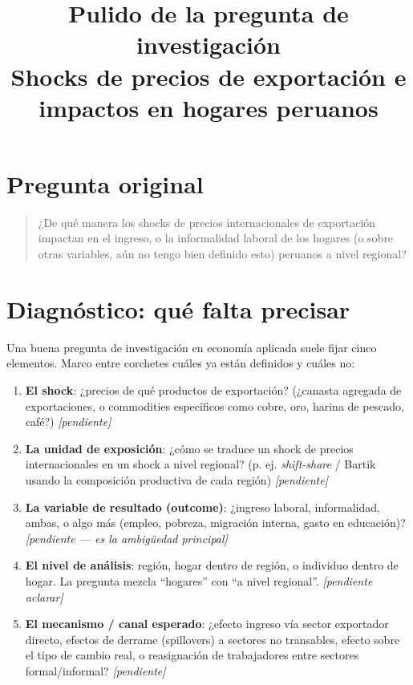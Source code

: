 \documentclass[11pt]{article}
\title{Pulido de la pregunta de investigación\\
\large Shocks de precios de exportación e impactos en hogares peruanos}
\author{}
\date{}
\begin{document}
\maketitle

\section{Pregunta original}
\begin{quote}
¿De qué manera los shocks de precios internacionales de exportación impactan en el ingreso, o la informalidad laboral de los hogares (o sobre otras variables, aún no tengo bien definido esto) peruanos a nivel regional?
\end{quote}

\section{Diagnóstico: qué falta precisar}
Una buena pregunta de investigación en economía aplicada suele fijar cinco elementos.
Marco entre corchetes cuáles ya están definidos y cuáles no:

\begin{enumerate}[label=(\arabic*)]
  \item \textbf{El shock}: ¿precios de qué productos de exportación? (¿canasta agregada de exportaciones, o commodities específicos como cobre, oro, harina de pescado, café?) \emph{[pendiente]}
  \item \textbf{La unidad de exposición}: ¿cómo se traduce un shock de precios internacionales en un shock a nivel regional? (p. ej. \textit{shift-share} / Bartik usando la composición productiva de cada región) \emph{[pendiente]}
  \item \textbf{La variable de resultado (outcome)}: ¿ingreso laboral, informalidad, ambas, o algo más (empleo, pobreza, migración interna, gasto en educación)? \emph{[pendiente — es la ambigüedad principal]}
  \item \textbf{El nivel de análisis}: región, hogar dentro de región, o individuo dentro de hogar. La pregunta mezcla ``hogares'' con ``a nivel regional''. \emph{[pendiente aclarar]}
  \item \textbf{El mecanismo / canal esperado}: ¿efecto ingreso vía sector exportador directo, efectos de derrame (spillovers) a sectores no transables, efecto sobre el tipo de cambio real, o reasignación de trabajadores entre sectores formal/informal? \emph{[pendiente]}
\end{enumerate}
\end{document}
